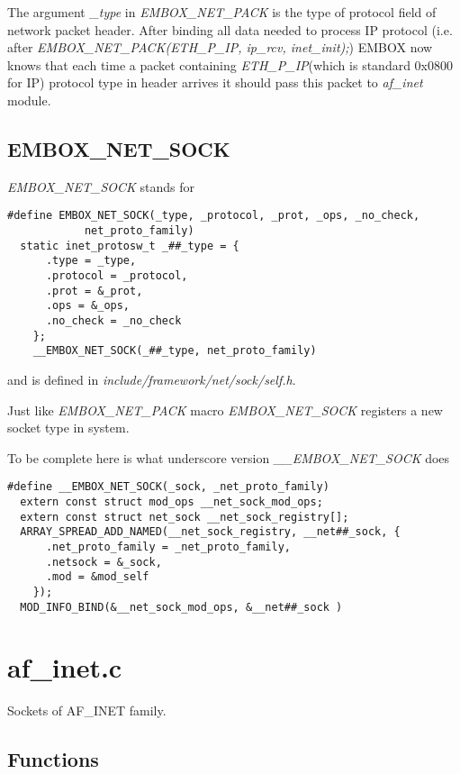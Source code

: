 \documentclass[12pt,a4paper]{article}
\begin{document}
 The argument {\it \_type } in {\it EMBOX\_NET\_PACK} is the type of protocol field of
network packet header. After binding all data needed to process IP protocol
(i.e. after {\it EMBOX\_NET\_PACK(ETH\_P\_IP, ip\_rcv, inet\_init);}) EMBOX now
knows that each time a packet containing {\it ETH\_P\_IP}(which is standard
0x0800 for IP) protocol type in header arrives it should pass this packet to
{\it af\_inet} module.


\subsection{EMBOX\_NET\_SOCK}
\label{sec:embox_net_sock}

{\it EMBOX\_NET\_SOCK} stands for
\begin{verbatim}
#define EMBOX_NET_SOCK(_type, _protocol, _prot, _ops, _no_check,
            net_proto_family)
  static inet_protosw_t _##_type = {
      .type = _type,
      .protocol = _protocol,
      .prot = &_prot,
      .ops = &_ops,
      .no_check = _no_check
    };
    __EMBOX_NET_SOCK(_##_type, net_proto_family)
\end{verbatim}
and is defined in {\it include/framework/net/sock/self.h}.

Just like {\it EMBOX\_NET\_PACK} macro {\it EMBOX\_NET\_SOCK} registers a new
socket type in system.

To be complete here is what underscore version {\it \_\_EMBOX\_NET\_SOCK} does
\begin{verbatim}
#define __EMBOX_NET_SOCK(_sock, _net_proto_family)
  extern const struct mod_ops __net_sock_mod_ops;
  extern const struct net_sock __net_sock_registry[];
  ARRAY_SPREAD_ADD_NAMED(__net_sock_registry, __net##_sock, {
      .net_proto_family = _net_proto_family,
      .netsock = &_sock,
      .mod = &mod_self
    });
  MOD_INFO_BIND(&__net_sock_mod_ops, &__net##_sock )
\end{verbatim}

\newpage

\section{af\_inet.c}
\label{sec:af_inet_c}
Sockets of AF\_INET family.

\subsection{Functions}
\end{document}

